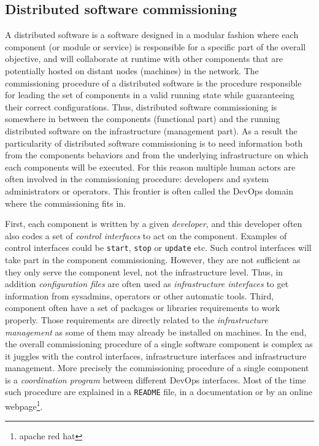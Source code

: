 
\subsection{Distributed software commissioning}

A distributed software is a software designed in a modular fashion
where each component (or module or service) is responsible for a
specific part of the overall objective, and will collaborate at
runtime with other components that are potentially hosted on distant
nodes (\ie machines) in the network.
%
The commissioning procedure of a distributed software is the procedure
responsible for leading the set of components in a valid running state
while guaranteeing their correct configurations. Thus, distributed
software commissioning is somewhere in between the components
(functional part) and the running distributed software on the
infrastructure (management part). As a result the particularity of
distributed software commissioning is to need information both from
the components behaviors and from the underlying infrastructure on
which each components will be executed.
For this reason multiple human actors are often involved in the
commissioning procedure: developers and system administrators or
operators. This frontier is often called the DevOps domain where the
commissioning fits in.

First, each component is written by a given \emph{developer}, and this
developer often also codes a set of \emph{control interfaces} to act
on the component. Examples of control interfaces could be
\texttt{start}, \texttt{stop} or \texttt{update} etc. Such control
interfaces will take part in the component commissioning. However,
they are not sufficient as they only serve the component level, not
the infrastructure level. Thus, in addition \emph{configuration files}
are often used as \emph{infrastructure interfaces} to get information
from sysadmins, operators or other automatic tools. Third, component
often have a set of packages or libraries requirements to work
properly. Those requirements are directly related to the
\emph{infrastructure management} as some of them may already be
installed on machines. In the end, the overall commissioning procedure
of a single software component is complex as it juggles with the
control interfaces, infrastructure interfaces and infrastructure
management. More precisely the commissioning procedure of a single
component is a \emph{coordination program} between different DevOps
interfaces. Most of the time such procedure are explained in a
\texttt{README} file, in a documentation or by an online
webpage\footnote{apache red hat}.

